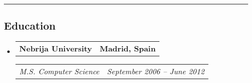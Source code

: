 \documentclass[11pt,letterpaper]{article}
\makeatletter
\newcommand{\headerrow}[2]
{\begin{tabular*}{\linewidth}{l@{\extracolsep{\fill}}r}
#1 &
#2 \\
\end{tabular*}}
\makeatother
\begin{document}
\hrule
\vspace{-1em}
\subsection*{\Large Education}

\begin{itemize}[leftmargin=1em]
	\parskip=0.1em
		
	\item
	      \headerrow
	      {\textbf{Nebrija University}}
	      {\textbf{Madrid, Spain}}
	      \headerrow
	      {\emph{M.S. Computer Science}}
	      {\emph{September 2006 -- June 2012}}
	      	      
\end{itemize}
\end{document}
